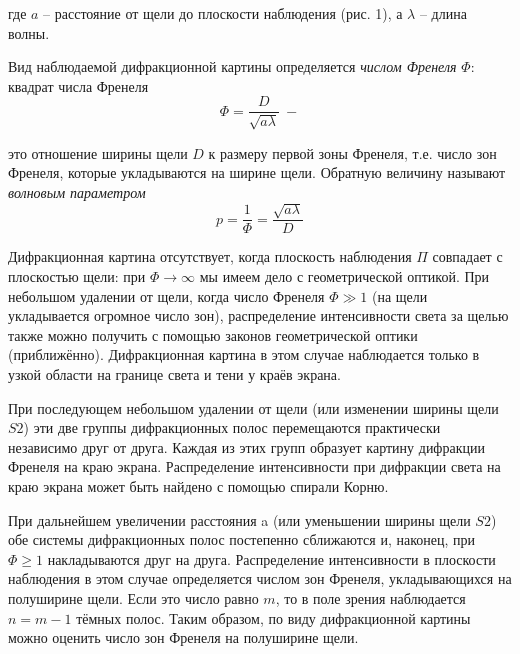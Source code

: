 \documentclass[14pt]{article}
\begin{document}
где
$a$ -- расстояние от щели до плоскости наблюдения (рис. 1), а $\lambda$ -- длина волны.

Вид наблюдаемой дифракционной картины определяется \textsl{числом Френеля} $\Phi$: квадрат числа Френеля
$$
	\Phi = \frac{D}{\sqrt{a\lambda}} ~-
$$

это отношение ширины щели $D$ к размеру первой зоны Френеля, т.е. число зон Френеля, которые укладываются на ширине щели. Обратную величину называют \textsl{волновым параметром}
$$
	p = \frac{1}{\Phi} = \frac{\sqrt{a\lambda}}{D}
$$

Дифракционная картина отсутствует, когда плоскость наблюдения $\Pi$ совпадает с плоскостью щели: при $\Phi \rightarrow \infty$ мы имеем дело с геометрической оптикой. При небольшом удалении от щели, когда число Френеля $\Phi \gg 1$ (на щели укладывается огромное число зон), распределение интенсивности света за щелью также можно получить с помощью законов геометрической оптики (приближённо). Дифракционная картина в этом случае наблюдается только в узкой области на границе света и тени у краёв экрана.

При последующем небольшом удалении от щели (или изменении ширины щели $S2$) эти две группы дифракционных полос перемещаются практически независимо друг от друга. Каждая из этих групп образует картину дифракции Френеля на краю экрана. Распределение интенсивности при дифракции света на краю экрана может быть найдено с помощью спирали Корню. 

При дальнейшем увеличении расстояния a (или уменьшении ширины щели $S2$) обе системы дифракционных полос постепенно сближаются и, наконец, при $\Phi \geq 1$ накладываются друг на друга. Распределение интенсивности в плоскости наблюдения в этом случае определяется числом зон Френеля, укладывающихся на полуширине щели. Если это число равно $m$, то в поле зрения наблюдается $n = m - 1$ тёмных полос. Таким образом, по виду дифракционной картины можно оценить число зон Френеля на полуширине щели.
\end{document}
